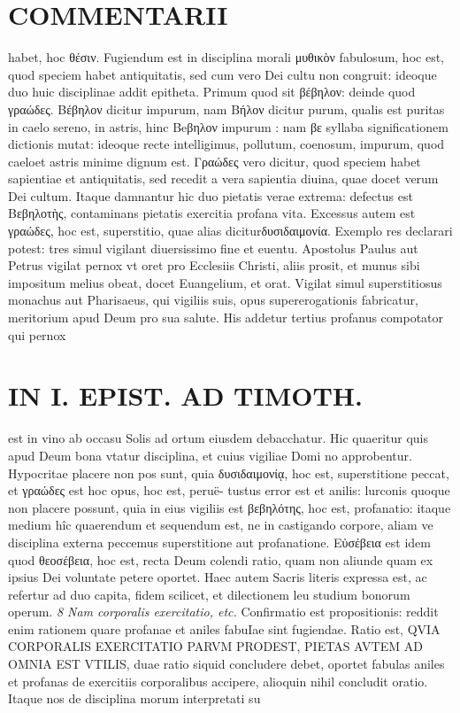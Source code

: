 \documentclass{article}
\begin{document}
\begin{pages}
\section*{COMMENTARII }
\marginpar{[ p.96 ]}\pstart habet, hoc θέσιν. Fugiendum est in disciplina morali μυθικὸν fabulosum, hoc est, quod speciem habet antiquitatis, sed cum vero Dei cultu non congruit: ideoque duo huic disciplinae addit epitheta. Primum quod sit βέβηλον: deinde quod γραώδες. Βέβηλον dicitur impurum, nam Βήλον dicitur purum, qualis est puritas in caelo sereno, in astris, hinc Beβηλον impurum : nam βε syllaba significationem dictionis mutat: ideoque recte intelligimus, pollutum, coenosum, impurum, quod caeloet astris minime dignum est. Γραώδες vero dicitur, quod speciem habet sapientiae et antiquitatis, sed recedit a vera sapientia diuina, quae docet verum Dei cultum.  \pend\pstart Itaque damnantur hic duo pietatis verae extrema: defectus est Bεβηλοτὴς, contaminans pietatis exercitia profana vita. Excessus autem est γραώδες, hoc est, superstitio, quae alias diciturδυσιδαιμονία. Exemplo res declarari potest: tres simul vigilant diuersissimo fine et euentu. Apostolus Paulus aut Petrus vigilat pernox vt oret pro Ecclesiis Christi, aliis prosit, et munus sibi impositum melius obeat, docet Euangelium, et orat. Vigilat simul superstitiosus monachus aut Pharisaeus, qui vigiliis suis, opus supererogationis fabricatur, meritorium apud Deum pro sua salute. His addetur tertius profanus compotator qui pernox\pend
\section*{IN I. EPIST. AD TIMOTH. }
\marginpar{[ p.97 ]}
\marginpar{[ p.G ]}\pstart est in vino ab occasu Solis ad ortum eiusdem debacchatur. Hic quaeritur quis apud Deum bona vtatur disciplina, et cuius vigiliae Domi no approbentur. Hypocritae placere non pos sunt, quia δυσιδαιμονίᾳ, hoc est, superstitione peccat, et γραώδες est hoc opus, hoc est, peruë- tustus error est et anilis: lurconis quoque non placere possunt, quia in eius vigiliis est βεβηλότης, hoc est, profanatio: itaque medium hîc quaerendum et sequendum est, ne in castigando corpore, aliam ve disciplina externa peccemus superstitione aut profanatione. Εὐσέβεια est idem quod θεοσέβεια, hoc est, recta Deum colendi ratio, quam non aliunde quam ex ipsius Dei voluntate petere oportet. Haec autem Sacris literis expressa est, ac refertur ad duo capita, fidem scilicet, et dilectionem leu studium bonorum operum.  \pend
\textit{8 Nam corporalis exercitatio, etc. }\pstart Confirmatio est propositionis: reddit enim rationem quare profanae et aniles fabuIae sint fugiendae. Ratio est, QVIA CORPORALIS EXERCITATIO PARVM PRODEST, PIETAS AVTEM AD OMNIA EST VTILIS, duae ratio siquid concludere debet, oportet fabulas aniles et profanas de exercitiis corporalibus accipere, alioquin nihil concludit oratio. Itaque nos de disciplina morum interpretati su\pend

\end{pages}
\end{document}
